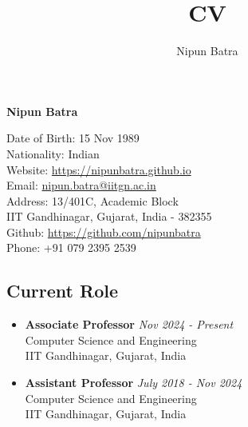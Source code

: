 \documentclass[letter,10pt]{article}
\title{CV}
\author{Nipun Batra}
\begin{document}
\setlength\itemsep{-1em}

\begin{center}
	\begin{Large}
		\textbf{Nipun Batra}\\
	\end{Large}
	
\end{center}



\begin{multicols}{2}
\begin{small}
\noindent Date of Birth: 15 Nov 1989 \\
Nationality: Indian \\
Website: \href{https://nipunbatra.github.io}{https://nipunbatra.github.io} \\ 
Email: \href{mailto:nipun.batra@iitgn.ac.in}{nipun.batra@iitgn.ac.in} \\
Address: 13/401C, Academic Block\\
	IIT Gandhinagar,
	Gujarat, India - 382355\\
Github: \href{https://github.com/nipunbatra}{https://github.com/nipunbatra}\\
Phone: +91 079 2395 2539
\end{small}
\end{multicols}

\subsection*{{\sc \textbf{Current Role}}\hspace{5pt}\noindent\hrulefill}
\begin{itemize}
\item[] 
    \textbf{Associate Professor} \hfill \textit{Nov 2024 - Present}\\
    Computer Science and Engineering \\
	IIT Gandhinagar, Gujarat, India
\item[] 
    \textbf{Assistant Professor} \hfill \textit{July 2018 - Nov 2024}\\
    Computer Science and Engineering \\
	IIT Gandhinagar, Gujarat, India
\end{itemize}
\end{document}
